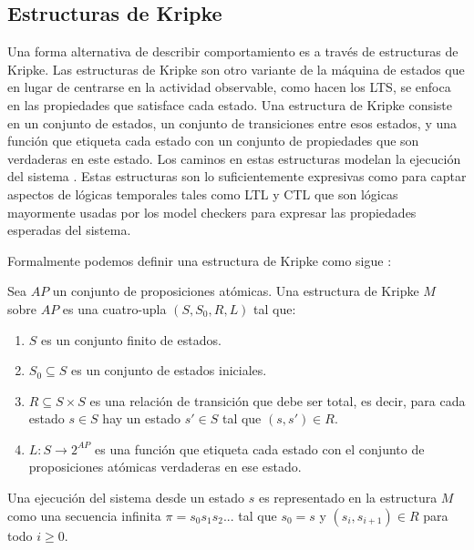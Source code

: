 \documentclass[pdftex,a4paper,12pt]{book}
\begin{document}
\subsection*{Estructuras de Kripke}
Una forma alternativa de describir comportamiento es a trav\'es de estructuras de Kripke. Las estructuras de Kripke son otro variante de la m\'aquina de estados que en lugar de centrarse en la actividad observable, como hacen los LTS, se enfoca en las propiedades que satisface cada estado. Una estructura de Kripke consiste en un conjunto de estados, un conjunto de transiciones entre esos estados, y una funci\'on que etiqueta cada estado con un conjunto de propiedades que son verdaderas en este estado. Los caminos en estas estructuras modelan la ejecuci\'on del sistema \cite{Clarke}. Estas estructuras son lo suficientemente expresivas como para captar aspectos de l\'ogicas temporales tales como LTL y CTL que son l\'ogicas mayormente usadas por los model checkers para expresar las propiedades esperadas del sistema.

Formalmente podemos definir una estructura de Kripke como sigue \cite{Clarke}:

Sea $AP$ un conjunto de proposiciones at\'omicas. Una estructura de Kripke $M$ sobre $AP$ es una cuatro-upla $(S,S_0,R,L)$ tal que:

\begin{enumerate}
\item $S$ es un conjunto finito de estados.
\item $S_0 \subseteq S$ es un conjunto de estados iniciales.
\item $R \subseteq S \times S$ es una relaci\'on de transici\'on que debe ser total, es decir, para cada estado $s \in S$ hay un estado $s' \in S$ tal que $(s,s') \in R$.
\item $L : S \rightarrow 2^{AP}$ es una funci\'on que etiqueta cada estado con el conjunto de proposiciones at\'omicas verdaderas en ese estado.
\end{enumerate}

Una ejecuci\'on del sistema desde un estado $s$ es representado en la estructura $M$ como una secuencia infinita $\pi = s_0s_1s_2...$ tal que $s_0 = s$ y $(s_i,s_{i+1})\in R$ para todo $i \geq 0$.
\end{document}
